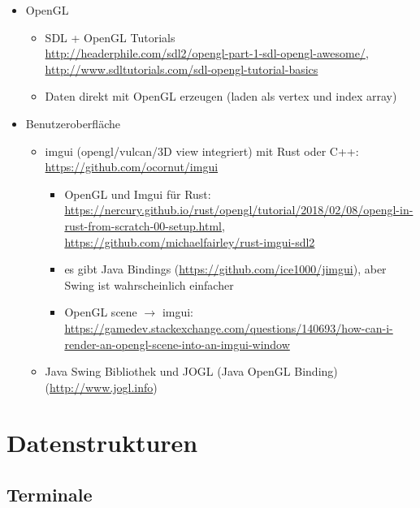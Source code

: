 \begin{itemize}
 \item OpenGL
 \begin {itemize}
  \item SDL + OpenGL Tutorials \\ \url{http://headerphile.com/sdl2/opengl-part-1-sdl-opengl-awesome/}, \\ \url{http://www.sdltutorials.com/sdl-opengl-tutorial-basics}
  \item Daten direkt mit OpenGL erzeugen (laden als vertex und index array)
 \end {itemize}

 \item Benutzeroberfläche
 \begin{itemize}
  \item imgui (opengl/vulcan/3D view integriert) mit Rust oder C++: \url{https://github.com/ocornut/imgui}
  
  \begin{itemize}
   \item OpenGL und Imgui für Rust: \url{https://nercury.github.io/rust/opengl/tutorial/2018/02/08/opengl-in-rust-from-scratch-00-setup.html}, \url{https://github.com/michaelfairley/rust-imgui-sdl2}
   \item es gibt Java Bindings (\url{https://github.com/ice1000/jimgui}), aber Swing ist wahrscheinlich einfacher
   \item OpenGL scene $\rightarrow$ imgui: \url{https://gamedev.stackexchange.com/questions/140693/how-can-i-render-an-opengl-scene-into-an-imgui-window}
  \end{itemize}

  
  \item Java Swing Bibliothek und JOGL (Java OpenGL Binding) (\url{http://www.jogl.info})
 \end{itemize}
\end{itemize}

\section{Datenstrukturen}

\subsection{Terminale}


